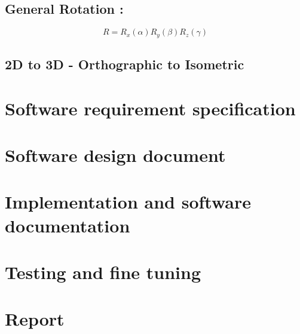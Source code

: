 \documentclass{report}
\begin{document}
\subsection{General Rotation :}

$$
R = R_x(\alpha)R_y(\beta)R_z(\gamma)
$$

\subsection{2D to 3D - Orthographic to Isometric}


\section{Software requirement specification}

\section{Software design document}

\section{Implementation and software documentation}

\section{Testing and fine tuning}

\section{Report}
\end{document}
